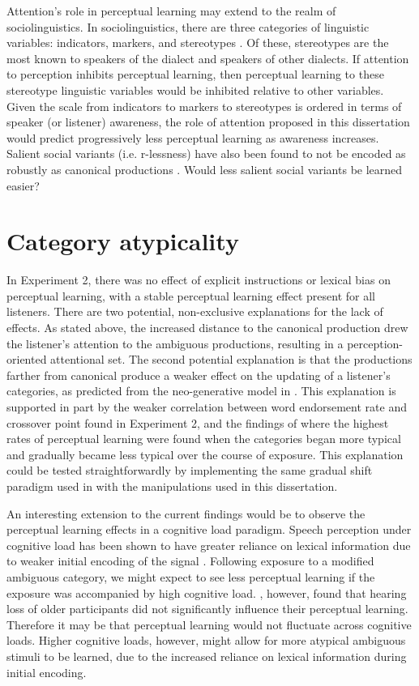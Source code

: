 Attention's role in perceptual learning may extend to the realm of sociolinguistics.  
In sociolinguistics, there are three categories of linguistic variables: indicators, markers, and stereotypes \citep{Labov1972}.
Of these, stereotypes are the most known to speakers of the dialect and speakers of other dialects.
If attention to perception inhibits perceptual learning, then perceptual learning to these stereotype linguistic variables would be inhibited relative to other variables.
Given the scale from indicators to markers to stereotypes is ordered in terms of speaker (or listener) awareness, the role of attention proposed in this dissertation would predict progressively less perceptual learning as awareness increases.
Salient social variants (i.e. r-lessness) have also been found to not be encoded as robustly as canonical productions \citep{Sumner2009}.
Would less salient social variants be learned easier?

\section{Category atypicality}

In Experiment 2, there was no effect of explicit instructions or lexical bias on perceptual learning, with a stable perceptual learning effect present for all listeners.
There are two potential, non-exclusive explanations for the lack of effects.
As stated above, the increased distance to the canonical production drew the listener's attention to the ambiguous productions, resulting in a perception-oriented attentional set.
The second potential explanation is that the productions farther from canonical produce a weaker effect on the updating of a listener's categories, as predicted from the neo-generative model in \citep{Pierrehumbert2002}.
This explanation is supported in part by the weaker correlation between word endorsement rate and crossover point found in Experiment 2, and the findings of \citet{Sumner2011} where the highest rates of perceptual learning were found when the categories began more typical and gradually became less typical over the course of exposure.
This explanation could be tested straightforwardly by implementing the same gradual shift paradigm used in \citet{Sumner2011} with the manipulations used in this dissertation.

An interesting extension to the current findings would be to observe the perceptual learning effects in a cognitive load paradigm.  
Speech perception under cognitive load has been shown to have greater reliance on lexical information due to weaker initial encoding of the signal \citep{Mattys2011}.  
Following exposure to a modified ambiguous category, we might expect to see less perceptual learning if the exposure was accompanied by high cognitive load.  
\citet{Scharenborg2014}, however, found that hearing loss of older participants did not significantly influence their perceptual learning.  
Therefore it may be that perceptual learning would not fluctuate across cognitive loads.
Higher cognitive loads, however, might allow for more atypical ambiguous stimuli to be learned, due to the increased reliance on lexical information during initial encoding.


